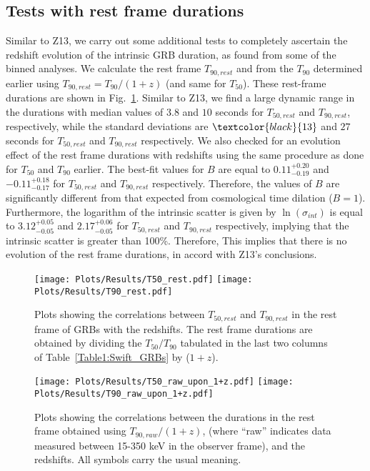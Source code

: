 \documentclass[prd,nofootinbib,preprintnumbers,floatfix]{revtex4}  %
\newcommand{\rthis}[1]{\textcolor{black}{#1}}
\begin{document}
\subsection{Tests with rest frame durations}
Similar to Z13, we carry out some additional tests to completely ascertain the redshift evolution of the intrinsic GRB duration, as  found from some of the binned analyses. We calculate the rest frame $T_{90,rest}$ and  from the $T_{90}$ determined earlier using $T_{90,rest} = T_{90}/(1+z)$ (and same for $T_{50}$). These rest-frame durations are  shown in Fig.~\ref{fig:rest_frame_raw_burst_intervals}. Similar to Z13, we find a large dynamic range in the durations with median values of $3.8$ and $10$ seconds for $T_{50,rest}$ and $T_{90,rest}$, respectively, while the standard deviations are $\rthis{13}$ and $27$ seconds for $T_{50,rest}$ and $T_{90,rest}$ respectively. We also checked for an evolution effect of the rest frame durations with redshifts using the same procedure as done for $T_{50}$ and $T_{90}$ earlier. The best-fit values for $B$ are equal to  $0.11^{+0.20}_{-0.19}$ and $-0.11^{+0.18}_{-0.17}$ for $T_{50,rest}$ and $T_{90,rest}$ respectively. Therefore, the values of $B$ are significantly different from that expected from cosmological time dilation ($B=1$). Furthermore, the logarithm of the intrinsic scatter is given by $\ln (\sigma_{int})$ is equal to  $3.12^{+0.05}_{-0.05}$ and $2.17^{+0.06}_{-0.05}$ for $T_{50,rest}$ and $T_{90,rest}$ respectively, implying that the intrinsic scatter is greater than 100\%. Therefore,  This implies that there is no evolution of the rest frame durations, in accord with Z13's conclusions.


\begin{figure}
    \centering
    \texttt{[image: Plots/Results/T50\_rest.pdf]}
    \texttt{[image: Plots/Results/T90\_rest.pdf]}
    \caption{Plots showing the correlations between $T_{50,rest}$ and $T_{90,rest}$ in the rest frame of GRBs with the redshifts. The rest frame durations are obtained by dividing the $T_{50}/T_{90}$  tabulated in the last two columns of Table~\ref{Table1:Swift_GRBs} by ($1+z$).}
    \label{fig:rest_frame_raw_burst_intervals}
\end{figure}


\begin{figure}
    \centering
    \texttt{[image: Plots/Results/T50\_raw\_upon\_1+z.pdf]}
    \texttt{[image: Plots/Results/T90\_raw\_upon\_1+z.pdf]}
    \caption{Plots showing the correlations between the durations in the rest frame obtained using  $T_{90,raw}/({1+z})$,  (where ``raw'' indicates data measured between 15-350 keV in the observer frame), and the redshifts. All symbols carry the usual meaning.}
    \label{fig:T_raw_upon_(1+z)_frame_raw_burst_intervals}
\end{figure}
\end{document}
